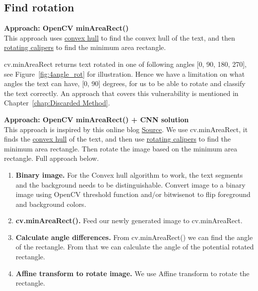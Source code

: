 \documentclass[Report.tex]{subfiles}
\begin{document}
\subsection{Find rotation}
\label{subsec:Find rotation}
\textbf{Approach: OpenCV minAreaRect()} \\
This approach uses \href{https://en.wikipedia.org/wiki/Convex_hull}{convex hull}
to find the convex hull of the text, and then
\href{https://en.wikipedia.org/wiki/Rotating_calipers}{rotating calipers} to
find the minimum area rectangle. \par
cv.minAreaRect returns text rotated in one of following angles [0\textdegree, 90\textdegree, 180\textdegree, 270\textdegree], see Figure~\ref{fig:4angle_rot} for illustration.
Hence we have a limitation on what angles the text can have, [0, 90] degrees, for us to be able to rotate and classify the text correctly. An approach that covers this vulnerability is mentioned in Chapter~\ref{chap:Discarded Method}.





\begin{flushleft}
  \textbf{Approach: OpenCV minAreaRect() + CNN solution} \\
  This approach is inspired by this online blog \href{https://www.pyimagesearch.com/2017/02/20/text-skew-correction-opencv-python/}{Source}\cite{rosebrock_text_2017}.
  We use cv.minAreaRect, it finds the \href{https://en.wikipedia.org/wiki/Convex_hull}{convex hull} of the text, and then use
  \href{https://en.wikipedia.org/wiki/Rotating_calipers}{rotating calipers} to
  find the minimum area rectangle. Then rotate the image based on the minimum area rectangle. Full approach below.
  \begin{enumerate}
    \item \textbf{Binary image.}
    For the Convex hull algorithm to work, the text segments and the background needs to be distinguishable. Convert image to a binary image using OpenCV threshold function and/or bitwise\textunderscore not to flip foreground and background colors.
    \item \textbf{cv.minAreaRect().}
    Feed our newly generated image to cv.minAreaRect.
    \item \textbf{Calculate angle differences.}
    From cv.minAreaRect() we can find the angle of the rectangle. From that we can calculate the angle of the potential rotated rectangle.
    \item \textbf{Affine transform to rotate image.}
    We use Affine transform to rotate the rectangle.
    \end{enumerate}
\end{flushleft}
\end{document}
